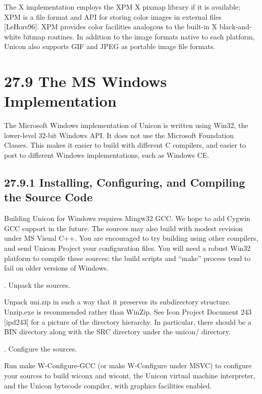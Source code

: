 The X implementation employs the XPM X pixmap library if it is
available; XPM is a file format and API for storing color
images in external files [LeHors96]. XPM provides color facilities
analogous to the built-in X black-and-white bitmap routines. In
addition to the image formats native to each platform, Unicon also
supports GIF and JPEG as portable image file formats.

\section[27.9 The MS Windows Implementation]{27.9 The MS Windows Implementation}

The Microsoft Windows implementation of Unicon is written using Win32,
the lower-level 32-bit Windows API. It does not use the Microsoft
Foundation Classes. This makes it easier to build with different C
compilers, and easier to port to different Windows implementations,
such as Windows CE.

\subsection[27.9.1 Installing, Configuring, and Compiling the Source Code]{27.9.1 Installing, Configuring, and Compiling the Source Code}

Building Unicon for Windows requires Mingw32 GCC. We hope to add
Cygwin GCC support in the future. The sources may also build with
modest revision under MS Visual C++. You are encouraged to try
building using other compilers, and send Unicon Project your
configuration files. You will need a robust Win32 platform to compile
these sources; the build scripts and ``make'' process tend to fail on
older versions of Windows.

{. Unpack the sources.}

Unpack uni.zip in such a way that it preserves its subdirectory
structure. Unzip.exe is recommended rather than WinZip.  See Icon
Project Document 243 [ipd243] for a picture of the directory
hierarchy. In particular, there should be a BIN directory along with
the SRC directory under the unicon/ directory.

{. Configure the sources.}


Run {\textquotedbl}make W-Configure-GCC{\textquotedbl} (or
{\textquotedbl}make W-Configure{\textquotedbl} under MSVC) to
configure your sources to build wiconx and wicont, the Unicon virtual
machine interpreter, and the Unicon bytecode compiler, with graphics
facilities enabled.

